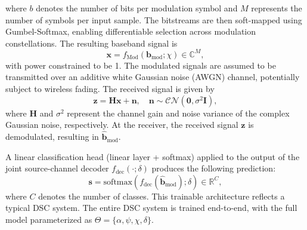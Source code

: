 \documentclass[journal]{IEEEtran}
\begin{document}
where \(b\) denotes the number of bits per modulation symbol and \(M\) represents the number of symbols per input sample. The bitstreams are then soft-mapped using Gumbel-Softmax, enabling differentiable selection across modulation constellations. The resulting baseband signal is
\begin{equation}
\mathbf{x} = f_{\mathrm{Mod}}(\mathbf{b}_{\text{mod}}; \chi) \in \mathbb{C}^{M},
\end{equation}
with power constrained to be 1.
The modulated signals are assumed to be transmitted over an additive white Gaussian noise (AWGN) channel, potentially subject to wireless fading. The received signal is given by
\begin{equation}
\mathbf{z} = 
\mathbf{H} \mathbf{x} + \mathbf{n}, \quad \mathbf{n} \sim \mathcal{CN}(\mathbf{0}, \sigma^2 \mathbf{I}),
\end{equation}
where \(\mathbf{H}\) and \(\sigma^2\) represent the channel gain and noise variance of the complex Gaussian 
noise, respectively. 
At the receiver, the received signal %
${\mathbf{z}}$  is demodulated, resulting in  $\hat{\mathbf{b}}_{\text{mod}}$.

A linear classification head (linear layer + softmax) applied to the output of the joint source-channel decoder \(f_{\mathrm{dec}}(\cdot; \delta)\) 
 produces the following prediction:
\begin{equation}
\mathbf{s} = \mathrm{softmax}(f_{\mathrm{dec}}( \hat{\mathbf{b}}_{\text{mod}}); \delta) \in \mathbb{R}^{C},
\end{equation}
where \(C\) denotes the number of classes. This trainable architecture reflects a typical DSC system.
The entire DSC system is trained  end-to-end, with the full model parameterized as \(\Theta = \{\alpha, \psi, \chi, \delta\}\).
\end{document}
